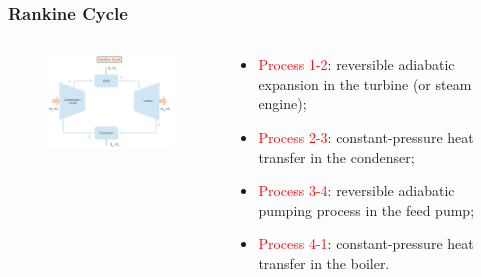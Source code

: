\documentclass[10pt,compress,handout,ignorenonframetext]{beamer}
\begin{document}
\begin{frame}
 \frametitle{Rankine Cycle}
 \begin{columns}
   \begin{column}[c]{0.6\linewidth}
    \begin{figure}%
     \begin{center}
      \includegraphics[width=7.5cm,clip]{./Pics/Simple_Rankine_Cycle}
     \end{center}
    \end{figure}  
   \end{column}
   \begin{column}[l]{0.4\linewidth}
     \begin{itemize}%
      \item <3-> \textcolor{red}{Process 1-2}: reversible adiabatic expansion in the turbine (or steam engine);
      \item <4-> \textcolor{red}{Process 2-3}: constant-pressure heat transfer in the condenser;
      \item <5-> \textcolor{red}{Process 3-4}: reversible adiabatic pumping process in the feed pump;
      \item <6-> \textcolor{red}{Process 4-1}: constant-pressure heat transfer in the boiler.  
     \end{itemize}
   \end{column}
  \end{columns}
 \normalsize
\end{frame}
\end{document}
